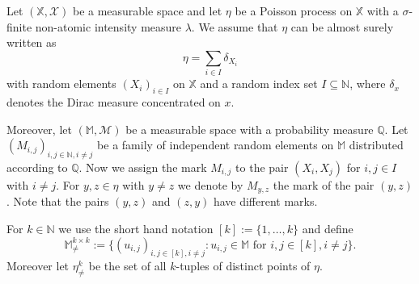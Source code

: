 \documentclass{article}
\theoremstyle{definition}
\numberwithin{equation}{section}
\theoremstyle{remark}
\begin{document}
\iffalse
Let $(\mathbb{X},\mathcal{X})$ be a measurable space and let $\eta$ be a Poisson process on $\mathbb{X}$ with a $\sigma$-finite non-atomic intensity measure $\lambda$. We assume that $\eta$ can be almost surely written as 
$$
\eta=\sum_{i\in I} \delta_{X_i}
$$
with random elements $(X_i)_{i\in I}$ on $\mathbb{X}$ and a random index set $I\subseteq\mathbb{N}$, where $\delta_x$ denotes the Dirac measure concentrated on $x$. 

Moreover, let $(\mathbb{M},\mathcal{M})$ be a measurable space with a probability measure $\mathbb{Q}$. Let $(M_{i,j})_{i,j\in\mathbb{N},i\neq j}$ be a family of independent random elements on $\mathbb{M}$ distributed according to $\mathbb{Q}$. Now we assign the mark $M_{i,j}$ to the pair $(X_i,X_j)$ for $i,j\in I$ with $i\neq j$. For $y,z\in\eta$ with $y\neq z$ we denote by $M_{y,z}$ the mark of the pair $(y,z)$. Note that the pairs $(y,z)$ and $(z,y)$ have different marks.

For $k\in\mathbb{N}$ we use the short hand notation $[k]:=\{1,\ldots,k\}$ and define
$$
\mathbb{M}^{k\times k}_{\neq}:=\{(u_{i,j})_{i,j\in[k],i\neq j}: u_{i,j}\in \mathbb{M} \text{ for } i,j\in[k],i\neq j\}.
$$
Moreover let $\eta^k_{\neq}$ be the set of all $k$-tuples of distinct points of $\eta$.
\end{document}
